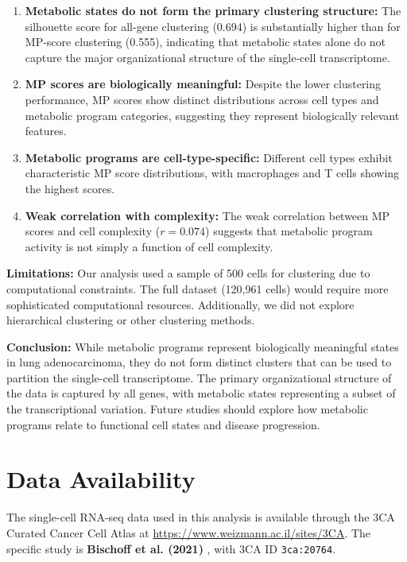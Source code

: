 \documentclass[11pt,a4paper]{article}
\begin{document}
\begin{enumerate}
    \item \textbf{Metabolic states do not form the primary clustering structure:} The silhouette score for all-gene clustering (0.694) is substantially higher than for MP-score clustering (0.555), indicating that metabolic states alone do not capture the major organizational structure of the single-cell transcriptome.
    
    \item \textbf{MP scores are biologically meaningful:} Despite the lower clustering performance, MP scores show distinct distributions across cell types and metabolic program categories, suggesting they represent biologically relevant features.
    
    \item \textbf{Metabolic programs are cell-type-specific:} Different cell types exhibit characteristic MP score distributions, with macrophages and T cells showing the highest scores.
    
    \item \textbf{Weak correlation with complexity:} The weak correlation between MP scores and cell complexity ($r = 0.074$) suggests that metabolic program activity is not simply a function of cell complexity.
\end{enumerate}

\textbf{Limitations:} Our analysis used a sample of 500 cells for clustering due to computational constraints. The full dataset (120,961 cells) would require more sophisticated computational resources. Additionally, we did not explore hierarchical clustering or other clustering methods.

\textbf{Conclusion:} While metabolic programs represent biologically meaningful states in lung adenocarcinoma, they do not form distinct clusters that can be used to partition the single-cell transcriptome. The primary organizational structure of the data is captured by all genes, with metabolic states representing a subset of the transcriptional variation. Future studies should explore how metabolic programs relate to functional cell states and disease progression.

\section{Data Availability}

The single-cell RNA-seq data used in this analysis is available through the 3CA Curated Cancer Cell Atlas at \url{https://www.weizmann.ac.il/sites/3CA}. The specific study is \textbf{Bischoff et al. (2021)} \cite{bischoff2021single}, with 3CA ID \texttt{3ca:20764}.
\end{document}
